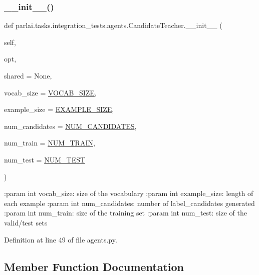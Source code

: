 \subsubsection{\texorpdfstring{\+\_\+\+\_\+init\+\_\+\+\_\+()}{\_\_init\_\_()}}
{\footnotesize\ttfamily def parlai.\+tasks.\+integration\+\_\+tests.\+agents.\+Candidate\+Teacher.\+\_\+\+\_\+init\+\_\+\+\_\+ (\begin{DoxyParamCaption}\item[{}]{self,  }\item[{}]{opt,  }\item[{}]{shared = {\ttfamily None},  }\item[{}]{vocab\+\_\+size = {\ttfamily \hyperlink{namespaceparlai_1_1tasks_1_1integration__tests_1_1agents_acce0481273f02014fb577733cfa8f2b7}{V\+O\+C\+A\+B\+\_\+\+S\+I\+ZE}},  }\item[{}]{example\+\_\+size = {\ttfamily \hyperlink{namespaceparlai_1_1tasks_1_1integration__tests_1_1agents_a1a9a556c90b625c74c9afd0a1a82ca3c}{E\+X\+A\+M\+P\+L\+E\+\_\+\+S\+I\+ZE}},  }\item[{}]{num\+\_\+candidates = {\ttfamily \hyperlink{namespaceparlai_1_1tasks_1_1integration__tests_1_1agents_a43719015a313515dcd768b12491ec3a1}{N\+U\+M\+\_\+\+C\+A\+N\+D\+I\+D\+A\+T\+ES}},  }\item[{}]{num\+\_\+train = {\ttfamily \hyperlink{namespaceparlai_1_1tasks_1_1integration__tests_1_1agents_abc5a5ed634c3ec4aa371a49b883d37a1}{N\+U\+M\+\_\+\+T\+R\+A\+IN}},  }\item[{}]{num\+\_\+test = {\ttfamily \hyperlink{namespaceparlai_1_1tasks_1_1integration__tests_1_1agents_ad6197fa4ad385bde5542da3aa644ad8b}{N\+U\+M\+\_\+\+T\+E\+ST}} }\end{DoxyParamCaption})}

\begin{DoxyVerb}:param int vocab_size: size of the vocabulary
:param int example_size: length of each example
:param int num_candidates: number of label_candidates generated
:param int num_train: size of the training set
:param int num_test: size of the valid/test sets
\end{DoxyVerb}
 

Definition at line 49 of file agents.\+py.



\subsection{Member Function Documentation}
\mbox{\label{classparlai_1_1tasks_1_1integration__tests_1_1agents_1_1CandidateTeacher_a4bc06e52e0a67e05924717ac04075d88}} 
